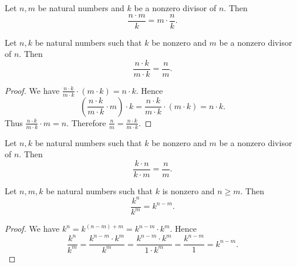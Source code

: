 \documentclass[10pt]{article}
\begin{document}
  \begin{forthel}
    \begin{corollary}
      Let $n, m$ be natural numbers and $k$ be a nonzero divisor of $n$.
      Then \[ \frac{n \cdot m}{k} = m \cdot \frac{n}{k}. \]
    \end{corollary}
  \end{forthel}

  \begin{forthel}
    \begin{proposition}
      Let $n, k$ be natural numbers such that $k$ be nonzero and $m$ be a nonzero divisor of $n$.
      Then \[ \frac{n \cdot k}{m \cdot k} = \frac{n}{m}. \]
    \end{proposition}
    \begin{proof}
      We have $\frac{n \cdot k}{m \cdot k} \cdot (m \cdot k) = n \cdot k$.
      Hence
      \[  \left( \frac{n \cdot k}{m \cdot k} \cdot m \right) \cdot k
          = \frac{n \cdot k}{m \cdot k} \cdot (m \cdot k)
          = n \cdot k. \]
      Thus $\frac{n \cdot k}{m \cdot k} \cdot m = n$.
      Therefore $\frac{n}{m} = \frac{n \cdot k}{m \cdot k}$.
    \end{proof}
  \end{forthel}

  \begin{forthel}
    \begin{corollary}
      Let $n, k$ be natural numbers such that $k$ be nonzero and $m$ be a nonzero divisor of $n$.
      Then \[ \frac{k \cdot n}{k \cdot m} = \frac{n}{m}. \]
    \end{corollary}
  \end{forthel}

  \begin{forthel}
    \begin{proposition}
      Let $n, m, k$ be natural numbers such that $k$ is nonzero and $n \geq m$.
      Then \[ \frac{k^{n}}{k^{m}} = k^{n - m}. \]
    \end{proposition}
    \begin{proof}
      We have $k^{n} = k^{(n - m) + m} = k^{n - m} \cdot k^{m}$.
      Hence
      \[  \frac{k^{n}}{k^{m}}
          = \frac{k^{n - m} \cdot k^{m}}{k^{m}}
          = \frac{k^{n - m} \cdot k^{m}}{1 \cdot k^{m}}
          = \frac{k^{n - m}}{1}
          = k^{n - m}. \]
    \end{proof}
  \end{forthel}
\end{document}
